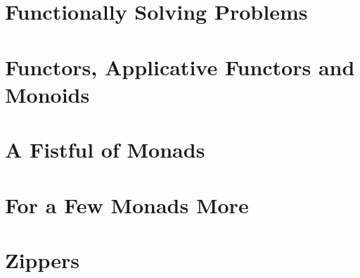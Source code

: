 \documentclass{article}
\begin{document}
\section{Functionally Solving Problems}

\newpage

\section{Functors, Applicative Functors and Monoids}

\newpage

\section{A Fistful of Monads}

\newpage

\section{For a Few Monads More}

\newpage

\section{Zippers}

\newpage
\end{document}
